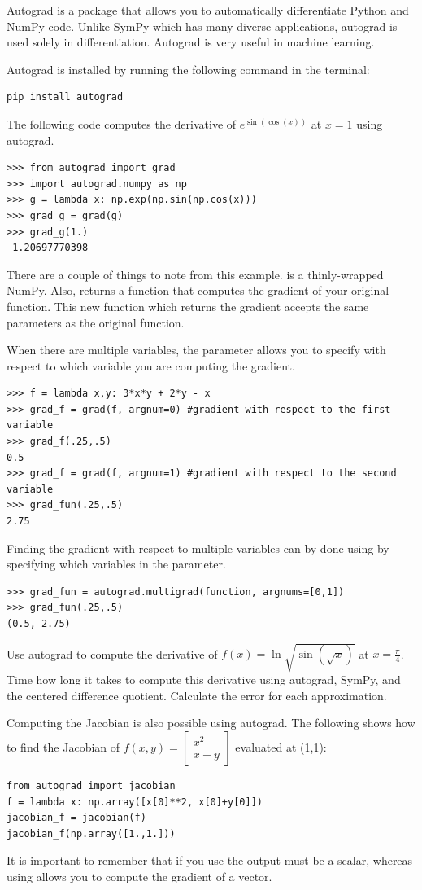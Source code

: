Autograd is a package that allows you to automatically differentiate Python and NumPy code.
Unlike SymPy which has many diverse applications, autograd is used  solely in differentiation.
Autograd is very useful in machine learning.

Autograd is installed by running the following command in the terminal:
\begin{lstlisting}
pip install autograd
\end{lstlisting}
The following code computes the derivative of $e^{\sin\left(\cos\left(x\right)\right)}$ at $x=1$ using autograd.
\begin{lstlisting}
>>> from autograd import grad
>>> import autograd.numpy as np
>>> g = lambda x: np.exp(np.sin(np.cos(x)))
>>> grad_g = grad(g)
>>> grad_g(1.)
-1.20697770398
\end{lstlisting}
There are a couple of things to note from this example.   is a thinly-wrapped NumPy.  Also,  returns a function that computes the gradient of your original function.  This new function which returns the gradient accepts the same parameters as the original function.

When there are multiple variables, the parameter  allows you to specify with respect to which variable you are computing the gradient.
\begin{lstlisting}
>>> f = lambda x,y: 3*x*y + 2*y - x
>>> grad_f = grad(f, argnum=0) #gradient with respect to the first variable
>>> grad_f(.25,.5)
0.5
>>> grad_f = grad(f, argnum=1) #gradient with respect to the second variable
>>> grad_fun(.25,.5)
2.75
\end{lstlisting}
Finding the gradient with respect to multiple variables can by done using  by specifying which variables in the  parameter.
\begin{lstlisting}
>>> grad_fun = autograd.multigrad(function, argnums=[0,1])
>>> grad_fun(.25,.5)
(0.5, 2.75)
\end{lstlisting}

\begin{problem}
Use autograd to compute the derivative of $f(x) = \ln \sqrt{ \sin (\sqrt {x}) }$ at $x=\frac{\pi}{4}$.
Time how long it takes to compute this derivative using autograd, SymPy, and the centered difference quotient.
Calculate the error for each approximation.
\end{problem}

Computing the Jacobian is also possible using autograd.  The following shows how to find the Jacobian of $f(x,y) = \left[\begin{array}{c} x^2 \\ x+y \end{array}\right]$ evaluated at (1,1):
\begin{lstlisting}
from autograd import jacobian
f = lambda x: np.array([x[0]**2, x[0]+y[0]])
jacobian_f = jacobian(f)
jacobian_f(np.array([1.,1.]))
\end{lstlisting}
It is important to remember that if you use  the output must be a scalar, whereas using  allows you to compute the gradient of a vector.


